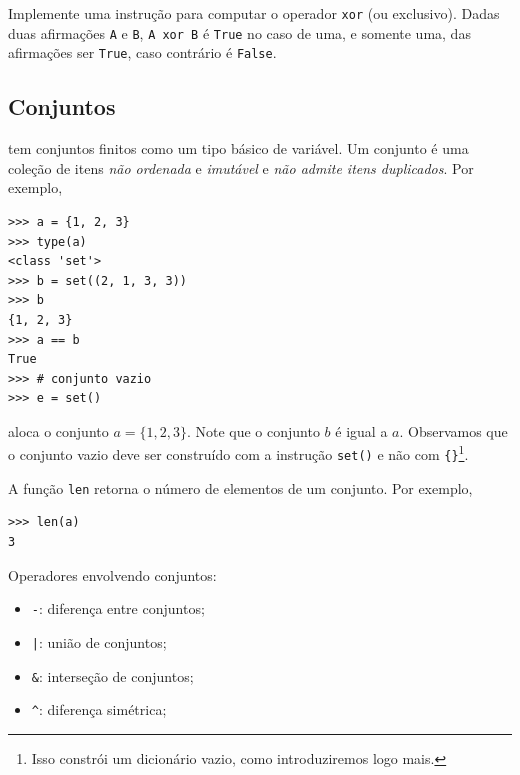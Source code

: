 \documentclass[12pt]{article}
\begin{document}
\begin{exr}
  Implemente uma instrução para computar o operador \lstinline+xor+ (ou exclusivo). Dadas duas afirmações \lstinline+A+ e \lstinline+B+, \lstinline+A xor B+ é \lstinline+True+ no caso de uma, e somente uma, das afirmações ser \lstinline+True+, caso contrário é \lstinline+False+.
\end{exr}

\subsection{Conjuntos}

{\python} tem conjuntos finitos como um tipo básico de variável. Um conjunto é uma coleção de itens \emph{não ordenada} e \emph{imutável} e \emph{não admite itens duplicados}. Por exemplo,

\begin{lstlisting}
>>> a = {1, 2, 3}
>>> type(a)
<class 'set'>
>>> b = set((2, 1, 3, 3))
>>> b
{1, 2, 3}
>>> a == b
True
>>> # conjunto vazio
>>> e = set()
\end{lstlisting}

aloca o conjunto $a = \{1,2, 3\}$. Note que o conjunto $b$ é igual a $a$. Observamos que o conjunto vazio deve ser construído com a instrução \lstinline+set()+ e não com \lstinline+{}+\footnote{Isso constrói um dicionário vazio, como introduziremos logo mais.}.

\begin{obs}
  A função {\python} \lstinline+len+ retorna o número de elementos de um conjunto. Por exemplo,
  
\begin{lstlisting}
>>> len(a)
3
\end{lstlisting}

\end{obs}

Operadores envolvendo conjuntos:
\begin{itemize}
\item[] \lstinline+-+: diferença entre conjuntos;
\item[] \lstinline+|+: união de conjuntos;
\item[] \lstinline+&+: interseção de conjuntos;
\item[] \lstinline+^+: diferença simétrica;
\end{itemize}
\end{document}
